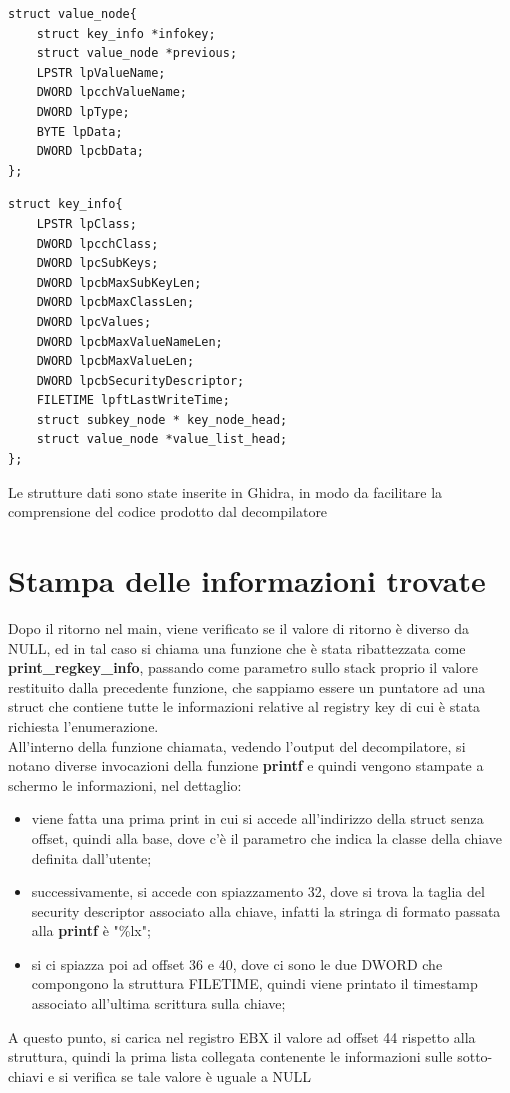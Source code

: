 \documentclass[12pt]{extarticle}
\begin{document}
\begin{lstlisting}
struct value_node{
	struct key_info *infokey;
	struct value_node *previous;
	LPSTR lpValueName;
	DWORD lpcchValueName;
	DWORD lpType;
	BYTE lpData;
	DWORD lpcbData;
};
\end{lstlisting}
\begin{lstlisting}
struct key_info{
	LPSTR lpClass;
	DWORD lpcchClass;
	DWORD lpcSubKeys;
	DWORD lpcbMaxSubKeyLen;
	DWORD lpcbMaxClassLen;
	DWORD lpcValues;
	DWORD lpcbMaxValueNameLen;
	DWORD lpcbMaxValueLen;
	DWORD lpcbSecurityDescriptor;
	FILETIME lpftLastWriteTime;
	struct subkey_node * key_node_head;
	struct value_node *value_list_head;
};
\end{lstlisting}
Le strutture dati sono state inserite in Ghidra, in modo da facilitare la comprensione del codice prodotto dal decompilatore
\section{Stampa delle informazioni trovate}
Dopo il ritorno nel main, viene verificato se il valore di ritorno è diverso da NULL, ed in tal caso si chiama una funzione che è stata ribattezzata come \textbf{print\_regkey\_info}, passando come parametro sullo stack proprio il valore restituito dalla precedente funzione, che sappiamo essere un puntatore ad una struct che contiene tutte le informazioni relative al registry key di cui è stata richiesta l'enumerazione.\\ All'interno della funzione chiamata, vedendo l'output del decompilatore, si notano diverse invocazioni della funzione \textbf{printf} e quindi vengono stampate a schermo le informazioni, nel dettaglio:
\begin{itemize}
\item viene fatta una prima print in cui si accede all'indirizzo della struct senza offset, quindi alla base, dove c'è il parametro che indica la classe della chiave definita dall'utente;
\item successivamente, si accede con spiazzamento 32, dove si trova la taglia del security descriptor associato alla chiave, infatti la stringa di formato passata alla \textbf{printf} è "\%lx";
\item si ci spiazza poi ad offset 36 e 40, dove ci sono le due DWORD che compongono la struttura FILETIME, quindi viene printato il timestamp associato all'ultima scrittura sulla chiave;
\end{itemize}
A questo punto, si carica nel registro EBX il valore ad offset 44 rispetto alla struttura, quindi la prima lista collegata contenente le informazioni sulle sotto-chiavi e si verifica se tale valore è uguale a NULL
\end{document}
